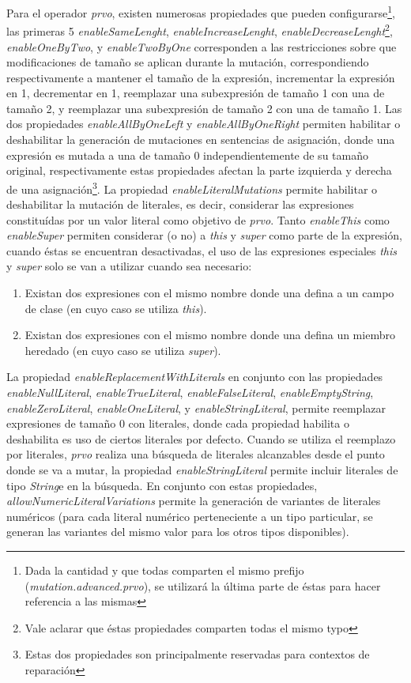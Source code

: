 Para el operador \emph{prvo}, existen numerosas propiedades que pueden configurarse\footnote{Dada la cantidad y que todas comparten el mismo prefijo (\emph{mutation.advanced.prvo}), se utilizar\'a la \'ultima parte de \'estas para hacer referencia a las mismas}, las primeras 5 \emph{enableSameLenght}, \emph{enableIncreaseLenght}, \emph{enableDecreaseLenght}\footnote{Vale aclarar que \'estas propiedades comparten todas el mismo typo}, \emph{enableOneByTwo}, y \emph{enableTwoByOne} corresponden a las restricciones sobre que modificaciones de tama\~no se aplican durante la mutaci\'on, correspondiendo respectivamente a mantener el tama\~no de la expresi\'on, incrementar la expresi\'on en 1, decrementar en 1, reemplazar una subexpresi\'on de tama\~no 1 con una de tama\~no 2, y reemplazar una subexpresi\'on de tama\~no 2 con una de tama\~no 1. Las dos propiedades \emph{enableAllByOneLeft} y \emph{enableAllByOneRight} permiten habilitar o deshabilitar la generaci\'on de mutaciones en sentencias de asignaci\'on, donde una expresi\'on es mutada a una de tama\~no 0 independientemente de su tama\~no original, respectivamente estas propiedades afectan la parte izquierda y derecha de una asignaci\'on\footnote{Estas dos propiedades son principalmente reservadas para contextos de reparaci\'on}. La propiedad \emph{enableLiteralMutations} permite habilitar o deshabilitar la mutaci\'on de literales, es decir, considerar las expresiones constitu\'idas por un valor literal como objetivo de \emph{prvo}. Tanto \emph{enableThis} como \emph{enableSuper} permiten considerar (o no) a \emph{this} y \emph{super} como parte de la expresi\'on, cuando \'estas se encuentran desactivadas, el uso de las expresiones especiales \emph{this} y \emph{super} solo se van a utilizar cuando sea necesario:
\begin{enumerate}[leftmargin=.75cm,align=left,style=nextline]
	\item Existan dos expresiones con el mismo nombre donde una defina a un campo de clase (en cuyo caso se utiliza \emph{this}).
	
	\item Existan dos expresiones con el mismo nombre donde una defina un miembro heredado (en cuyo caso se utiliza \emph{super}).
\end{enumerate}
La propiedad \emph{enableReplacementWithLiterals} en conjunto con las propiedades \emph{enableNullLiteral}, \emph{enableTrueLiteral}, \emph{enableFalseLiteral}, \emph{enableEmptyString}, \emph{enableZeroLiteral}, \emph{enableOneLiteral}, y \emph{enableStringLiteral}, permite reemplazar expresiones de tama\~no 0 con literales, donde cada propiedad habilita o deshabilita es uso de ciertos literales por defecto. Cuando se utiliza el reemplazo por literales, \emph{prvo} realiza una b\'usqueda de literales alcanzables desde el punto donde se va a mutar, la propiedad \emph{enableStringLiteral} permite incluir literales de tipo \emph{String}e en la b\'usqueda. En conjunto con estas propiedades, \emph{allowNumericLiteralVariations} permite la generaci\'on de variantes de literales num\'ericos (para cada literal num\'erico perteneciente a un tipo particular, se generan las variantes del mismo valor para los otros tipos disponibles).

